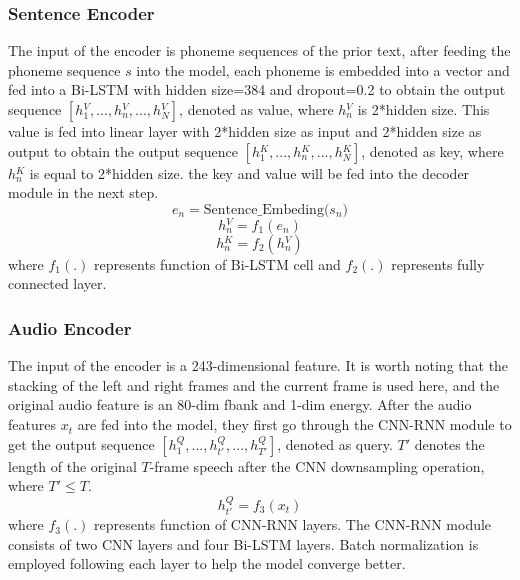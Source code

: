 \documentclass[a4paper]{article}
\begin{document}
\subsubsection{Sentence Encoder}
The input of the encoder is phoneme sequences of the prior text,  after feeding the phoneme sequence $s$ into the model, each phoneme is embedded into a vector and fed into a Bi-LSTM with hidden size=384 and dropout=0.2 to obtain the output sequence $ { [h{^V_1}, ... ,h{^V_{n}}, ... ,h{^V_{N}}] }$, denoted as value, where $h{^V_{n}}$ is 2*hidden size. This value is fed into linear layer with 2*hidden size as input and 2*hidden size as output to obtain the output sequence $ [h{^K_1}, ... ,h{^K_{n}}, ... ,h{^K_{N}}]$, denoted as key, where $h{^K_{n}}$ is equal to 2*hidden size. the key and value will be fed into the decoder module in the next step.
\begin{equation}
  e_n \mathrm{ = Sentence\_Embeding(}s_n)  \label{eq:embed}
\end{equation}
\begin{equation}
   h{^V_n} = f_1(e_n) \label{eq:hv}
\end{equation}
\begin{equation}
   h{^K_n} = f_2(h{^V_n}) \label{eq:hk}
\end{equation}
where $f_1(.)$ represents function of Bi-LSTM cell and $f_2(.)$ represents fully connected layer.



\subsubsection{Audio Encoder}
The input of the encoder is a 243-dimensional feature. It is worth noting that the stacking of the left and right frames and the current frame is used here, and the original audio feature is an 80-dim fbank and 1-dim energy. After the audio features $x_t$ are fed into the model, they first go through the CNN-RNN module to get the output sequence $ [h{^Q_1}, ..., h{^Q_{t'}}, ...,h{^Q_{T'}}] $, denoted as query. $T'$ denotes the length of the original $T$-frame speech after the CNN downsampling operation, where $T' \leqslant T$.
\begin{equation}
  {   h{^Q_{t'}} = f_3(x_t) } \label{eq:hQ} 
\end{equation}
where $f_3(.)$ represents function of CNN-RNN layers. The CNN-RNN module consists of two CNN layers and four Bi-LSTM layers. Batch normalization is employed following each layer to help the model converge better.
\end{document}
